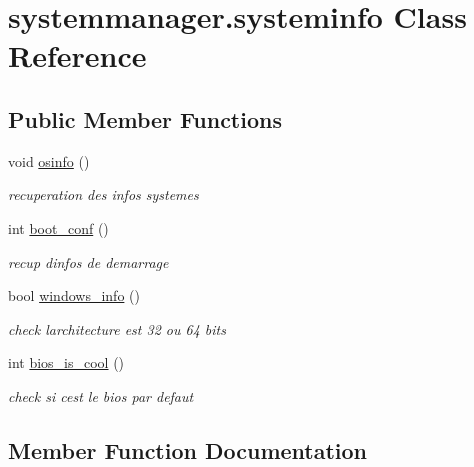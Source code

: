 \hypertarget{classsystemmanager_1_1systeminfo}{}\section{systemmanager.\+systeminfo Class Reference}
\label{classsystemmanager_1_1systeminfo}
\subsection*{Public Member Functions}
\begin{DoxyCompactItemize}
\item 
void \hyperlink{classsystemmanager_1_1systeminfo_a02b1119e5b013545a0c63b5d28cfe983}{osinfo} ()
\begin{DoxyCompactList}\small\item\em recuperation des infos systemes \end{DoxyCompactList}\item 
int \hyperlink{classsystemmanager_1_1systeminfo_af610a8922ba5c4e496b0f1a8d6a7c2e9}{boot\+\_\+conf} ()
\begin{DoxyCompactList}\small\item\em recup d\textquotesingle{}infos de demarrage \end{DoxyCompactList}\item 
bool \hyperlink{classsystemmanager_1_1systeminfo_a63ce06565645345c5d45034bb05d462e}{windows\+\_\+info} ()
\begin{DoxyCompactList}\small\item\em check l\textquotesingle{}architecture est 32 ou 64 bits \end{DoxyCompactList}\item 
int \hyperlink{classsystemmanager_1_1systeminfo_a43e349dc119b24a8dda4493eb9f628e5}{bios\+\_\+is\+\_\+cool} ()
\begin{DoxyCompactList}\small\item\em check si c\textquotesingle{}est le bios par defaut \end{DoxyCompactList}\end{DoxyCompactItemize}


\subsection{Member Function Documentation}
\mbox{\label{classsystemmanager_1_1systeminfo_a43e349dc119b24a8dda4493eb9f628e5}} 
